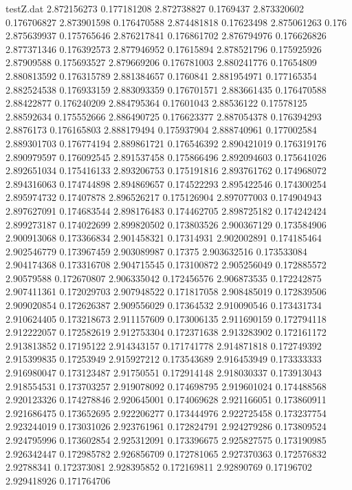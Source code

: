 \begin{filecontents*}{testZ.dat}
2.872156273  0.177181208
2.872738827  0.1769437
2.873320602  0.176706827
2.873901598  0.176470588
2.874481818  0.17623498
2.875061263  0.176
2.875639937  0.175765646
2.876217841  0.176861702
2.876794976  0.176626826
2.877371346  0.176392573
2.877946952  0.17615894
2.878521796  0.175925926
2.87909588  0.175693527
2.879669206  0.176781003
2.880241776  0.17654809
2.880813592  0.176315789
2.881384657  0.1760841
2.881954971  0.177165354
2.882524538  0.176933159
2.883093359  0.176701571
2.883661435  0.176470588
2.88422877  0.176240209
2.884795364  0.17601043
2.88536122  0.17578125
2.88592634  0.175552666
2.886490725  0.176623377
2.887054378  0.176394293
2.8876173  0.176165803
2.888179494  0.175937904
2.888740961  0.177002584
2.889301703  0.176774194
2.889861721  0.176546392
2.890421019  0.176319176
2.890979597  0.176092545
2.891537458  0.175866496
2.892094603  0.175641026
2.892651034  0.175416133
2.893206753  0.175191816
2.893761762  0.174968072
2.894316063  0.174744898
2.894869657  0.174522293
2.895422546  0.174300254
2.895974732  0.17407878
2.896526217  0.175126904
2.897077003  0.174904943
2.897627091  0.174683544
2.898176483  0.174462705
2.898725182  0.174242424
2.899273187  0.174022699
2.899820502  0.173803526
2.900367129  0.173584906
2.900913068  0.173366834
2.901458321  0.17314931
2.902002891  0.174185464
2.902546779  0.173967459
2.903089987  0.17375
2.903632516  0.173533084
2.904174368  0.173316708
2.904715545  0.173100872
2.905256049  0.172885572
2.90579588  0.172670807
2.906335042  0.172456576
2.906873535  0.172242875
2.907411361  0.172029703
2.907948522  0.171817058
2.908485019  0.172839506
2.909020854  0.172626387
2.909556029  0.17364532
2.910090546  0.173431734
2.910624405  0.173218673
2.911157609  0.173006135
2.911690159  0.172794118
2.912222057  0.172582619
2.912753304  0.172371638
2.913283902  0.172161172
2.913813852  0.17195122
2.914343157  0.171741778
2.914871818  0.172749392
2.915399835  0.17253949
2.915927212  0.173543689
2.916453949  0.173333333
2.916980047  0.173123487
2.91750551  0.172914148
2.918030337  0.173913043
2.918554531  0.173703257
2.919078092  0.174698795
2.919601024  0.174488568
2.920123326  0.174278846
2.920645001  0.174069628
2.921166051  0.173860911
2.921686475  0.173652695
2.922206277  0.173444976
2.922725458  0.173237754
2.923244019  0.173031026
2.923761961  0.172824791
2.924279286  0.173809524
2.924795996  0.173602854
2.925312091  0.173396675
2.925827575  0.173190985
2.926342447  0.172985782
2.926856709  0.172781065
2.927370363  0.172576832
2.92788341  0.172373081
2.928395852  0.172169811
2.92890769  0.17196702
2.929418926  0.171764706

\end{filecontents*}
